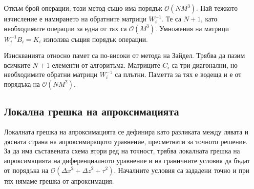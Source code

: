 \documentclass[12pt]{article}
\numberwithin{equation}{section}
\begin{document}
Откъм брой операции, този метод също има порядък $\mathcal{O}(N M^3)$. Най-тежкото изчисление е намирането на обратните матрици $W_i^{-1}$. Те са $N+1$, като необходимите операции за една от тях са $\mathcal{O}(M^3)$. Умножения на матрици $W_i^{-1}B_i = K_i$ използва същия порядък операции.

Изискванията относно памет са по-високи от метода на Зайдел. Трябва да пазим всичките $N+1$ елементи от алгоритъма. Матриците $C_i$ са три-диагонални, но необходимите обратни матрици $W_i^{-1}$ са плътни. Паметта за тях е водеща и е от порядъка на $\mathcal{O}(N M^2)$.

\subsection{Локална грешка на апроксимацията}
Локалната грешка на апроксимацията се дефинира като разликата между лявата и дясната страна на апроксимиращото уравнение, пресметнати за точното решение. За да има съставената схема втори ред на точност, трябва локалната грешка на апроксимацията на диференциалното уравнение и на граничните условия да бъдат от порядъка на $\mathcal{O}(\Delta x^2 + \Delta z^2 + \tau^2)$. Началните условия са зададени точно и при тях нямаме грешка от апроксимация.
\end{document}
